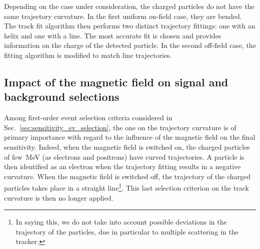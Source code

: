Depending on the case under consideration, the charged particles do not have the same trajectory curvature.
In the first uniform on-field case, they are bended.
The track fit algorithm then performs two distinct trajectory fittings: one with an helix and one with a line.
The most accurate fit is chosen and provides information on the charge of the detected particle.
In the second off-field case, the fitting algorithm is modified to match line trajectories.

\subsection{Impact of the magnetic field on signal and background selections}

Among first-order event selection criteria considered in Sec.~\ref{sec:sensitivity_ev_selection}, the one on the trajectory curvature is of primary importance with regard to the influence of the magnetic field on the final sensitivity.
Indeed, when the magnetic field is switched on, the charged particles of few~MeV (as electrons and positrons) have curved trajectories.
A particle is then identified as an electron when the trajectory fitting results in a negative curvature.
When the magnetic field is switched off, the trajectory of the charged particles takes place in a straight line\footnote{In saying this, we do not take into account possible deviations in the trajectory of the particles, due in particular to multiple scattering in the tracker.}.
This last selection criterion on the track curvature is then no longer applied.

